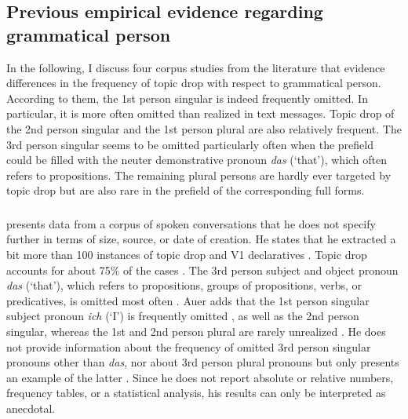\subsection{Previous empirical evidence regarding grammatical person}\label{sec:usage.person.studies}
In the following, I discuss four corpus studies from the literature \citep{auer1993, androutsopoulos.schmidt2002,doring2002,frick2017} that evidence differences in the frequency of topic drop with respect to grammatical person.
According to them, the 1st person singular is indeed frequently omitted.
In particular, it is more often omitted than realized in text messages.
Topic drop of the 2nd person singular and the 1st person plural are also relatively frequent.
The 3rd person singular seems to be omitted particularly often when the prefield could be filled with the neuter demonstrative pronoun \textit{das} (`that'), which often refers to propositions.
The remaining plural persons are hardly ever targeted by topic drop but are also rare in the prefield of the corresponding full forms.

\subsubsection{\citet{auer1993}}
\citet{auer1993} presents data from a corpus of spoken conversations that he does not specify further in terms of size, source, or date of creation.
He states that he extracted a bit more than 100 instances of topic drop and V1 declaratives \citep[195]{auer1993}. 
Topic drop accounts for about 75\% of the cases \citep[198]{auer1993}.
The 3rd person subject and object pronoun \textit{das} (`that'), which refers to propositions, groups of propositions, verbs, or predicatives, is omitted most often \citep[200]{auer1993}.
Auer adds that the 1st person singular subject pronoun \textit{ich} (`I') is frequently omitted \citep[198]{auer1993}, as well as the 2nd person singular, whereas the 1st and 2nd person plural are rarely unrealized \citep[199]{auer1993}.
He does not provide information about the frequency of omitted 3rd person singular pronouns other than \textit{das}, nor about 3rd person plural pronouns but only presents an example of the latter \citep[199, example 10]{auer1993}.
Since he does not report absolute or relative numbers, frequency tables, or a statistical analysis, his results can only be interpreted as anecdotal.

